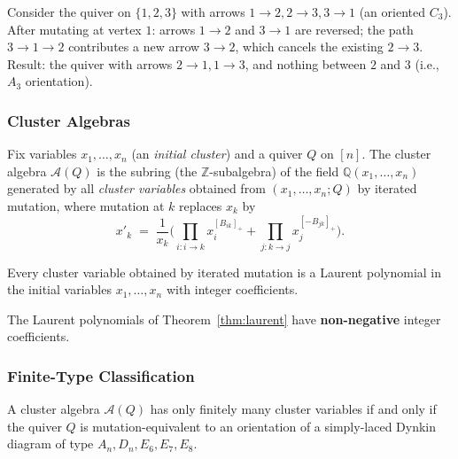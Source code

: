 \begin{example}
Consider the quiver on $\{1, 2, 3\}$ with arrows $1 \to 2, 2 \to 3,
3 \to 1$ (an oriented $C_3$). After mutating at vertex $1$:
arrows $1 \to 2$ and $3 \to 1$ are reversed; the path $3 \to 1 \to 2$
contributes a new arrow $3 \to 2$, which cancels the existing
$2 \to 3$. Result: the quiver with arrows $2 \to 1, 1 \to 3$, and
nothing between $2$ and $3$ (i.e., $A_3$ orientation).
\end{example}

\subsubsection{Cluster Algebras}

\begin{definition}\label{def:cluster}
Fix variables $x_1, \ldots, x_n$ (an \emph{initial cluster}) and a
quiver $Q$ on $[n]$. The cluster algebra $\mathcal A(Q)$ is the
subring (the $\mathbb Z$-subalgebra) of the field
$\mathbb Q(x_1, \ldots, x_n)$ generated by all \emph{cluster variables}
obtained from $(x_1, \ldots, x_n; Q)$ by iterated mutation, where
mutation at $k$ replaces $x_k$ by
\[
  x'_k \;=\; \frac{1}{x_k}\Big(\prod_{i : i \to k} x_i^{[B_{ik}]_+} + \prod_{j : k \to j} x_j^{[-B_{jk}]_+}\Big).
\]
\end{definition}

\begin{theorem}\label{thm:laurent}
Every cluster variable obtained by iterated mutation is a Laurent
polynomial in the initial variables $x_1, \ldots, x_n$ with integer
coefficients.
\end{theorem}

\begin{theorem}
The Laurent polynomials of Theorem~\ref{thm:laurent} have
\textbf{non-negative} integer coefficients.
\end{theorem}

\subsubsection{Finite-Type Classification}

\begin{theorem}\label{thm:fzfinite}
A cluster algebra $\mathcal A(Q)$ has only finitely many cluster
variables if and only if the quiver $Q$ is mutation-equivalent to an
orientation of a simply-laced Dynkin diagram of type
$A_n, D_n, E_6, E_7, E_8$.
\end{theorem}

